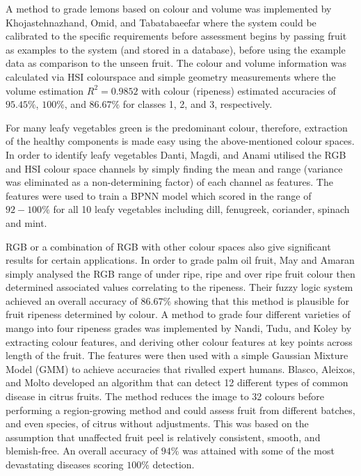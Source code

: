 \documentclass[fleqn,twoside,12pt]{report}
\begin{document}
A method to grade lemons based on colour and volume was implemented by Khojastehnazhand, Omid, and Tabatabaeefar \cite{khojastehnazhand} where the system could be calibrated to the specific requirements before assessment begins by passing fruit as examples to the system (and stored in a database), before using the example data as comparison to the unseen fruit. The colour and volume information was calculated via HSI colourspace and simple geometry measurements where the volume estimation $R^2 = 0.9852$ with colour (ripeness) estimated accuracies of $95.45\%$, $100\%$, and $86.67\%$ for classes 1, 2, and 3, respectively.

For many leafy vegetables green is the predominant colour, therefore, extraction of the healthy components is made easy using the above-mentioned colour spaces. In order to identify leafy vegetables Danti, Magdi, and Anami \cite{danti} utilised the RGB and HSI colour space channels by simply finding the mean and range (variance was eliminated as a non-determining factor) of each channel as features. The features were used to train a BPNN model which scored in the range of $92-100\%$ for all 10 leafy vegetables including dill, fenugreek, coriander, spinach and mint. 

RGB or a combination of RGB with other colour spaces also give significant results for certain applications. In order to grade palm oil fruit, May and Amaran \cite{may} simply analysed the RGB range of under ripe, ripe and over ripe fruit colour then determined associated values correlating to the ripeness. Their fuzzy logic system achieved an overall accuracy of $86.67\%$ showing that this method is plausible for fruit ripeness determined by colour. A method to grade four different varieties of mango into four ripeness grades was implemented by Nandi, Tudu, and Koley \cite{nandi} by extracting colour features, and deriving other colour features at key points across length of the fruit. The features were then used with a simple Gaussian Mixture Model (GMM) to achieve accuracies that rivalled expert humans. Blasco, Aleixos, and Molto \cite{blasco2} developed an algorithm that can detect 12 different types of common disease in citrus fruits. The method reduces the image to 32 colours before performing a region-growing method and could assess fruit from different batches, and even species, of citrus without adjustments. This was based on the assumption that unaffected fruit peel is relatively consistent, smooth, and blemish-free. An overall accuracy of $94\%$ was attained with some of the most devastating diseases scoring $100\%$ detection. 
\end{document}
